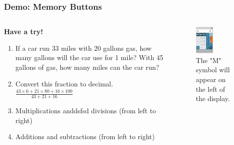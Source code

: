 \documentclass[
	11pt, %
]{beamer}
\begin{document}
\begin{frame}
	\frametitle{Demo: Memory Buttons}
	\begin{columns}[t]
	        \begin{column}{0.5\textwidth}
	        \textbf{Have a try!}
		        \begin{enumerate}
					\item If a car run 33 miles with 20 gallons gas, how many gallons will the car use for 1 mile? With 45 gallons of gas, how many miles can the car run? 
					\item Convert this fraction to decimal. $\frac{43 \times 6 + 21 \times 80 + 16 \times 100}{43 + 21 + 16}$
					\item Multiplications anddsfsd divisions (from left to right)
					\item Additions and subtractions (from left to right)
				   \end{enumerate}
			\end{column}

			\begin{column}{0.5\textwidth}
			   \begin{figure}
				    \includegraphics[width=0.5\textwidth]{Memory_Buttons.png}
				    \caption{The "M" symbol will appear on the left of the display.}
			    \end{figure}
			\end{column}
	\end{columns}
\end{frame}

\end{document}
